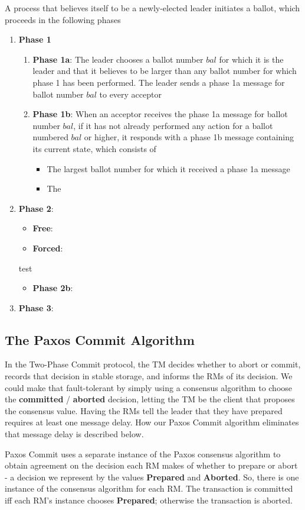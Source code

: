 \documentclass[11pt]{article}
\begin{document}
A process that believes itself to be a newly-elected leader initiates a ballot, which proceeds in the
following phases
\begin{enumerate}
\item \textbf{Phase 1}
\begin{enumerate}
\item \textbf{Phase 1a}: The leader chooses a ballot number \(bal\) for which it is the leader and that it
believes to be larger than any ballot number for which phase 1 has been performed. The leader
sends a phase 1a message for ballot number \(bal\) to every acceptor
\item \textbf{Phase 1b}: When an acceptor receives the phase 1a message for ballot number \(bal\), if it has
not already performed any action for a ballot numbered \(bal\) or higher, it responds with a
phase 1b message containing its current state, which consists of
\begin{itemize}
\item The largest ballot number for which it received a phase 1a message
\item The
\end{itemize}
\end{enumerate}
\item \textbf{Phase 2}:
\begin{itemize}
\item \textbf{Free}:
\item \textbf{Forced}:
\end{itemize}
test
\begin{itemize}
\item \textbf{Phase 2b}:
\end{itemize}
\item \textbf{Phase 3}:
\end{enumerate}
\subsection{The Paxos Commit Algorithm}
\label{sec:org0c190e2}
In the Two-Phase Commit protocol, the TM decides whether to abort or commit, records that decision in
stable storage, and informs the RMs of its decision. We could make that fault-tolerant by simply using
a consensus algorithm to choose the \textbf{committed} / \textbf{aborted} decision, letting the TM be the client that
proposes the consensus value. Having the RMs tell the leader that they have prepared requires at least
one message delay. How our Paxos Commit algorithm eliminates that message delay is described below.

Paxos Commit uses a separate instance of the Paxos consensus algorithm to obtain agreement on the
decision each RM makes of whether to prepare or abort - a decision we represent by the values
\textbf{Prepared} and \textbf{Aborted}. So, there is one instance of the consensus algorithm for each RM. The
transaction is committed iff each RM's instance chooses \textbf{Prepared}; otherwise the transaction is aborted.
\end{document}

